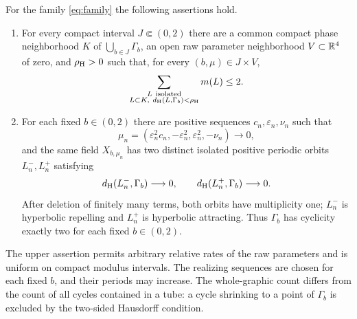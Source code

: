 \begin{samepage}
\begin{theorem}\label{thm:main}
For the family \eqref{eq:family} the following assertions hold.
\begin{enumerate}
\item For every compact interval $J\Subset(0,2)$ there are a common
compact phase neighborhood $K$ of $\bigcup_{b\in J}\Gamma_b$, an open
raw parameter neighborhood $V\subset\mathbb R^4$ of zero, and
$\rho_{\rm H}>0$ such that, for every $(b,\mu)\in J\times V$,
\begin{equation}\label{eq:upper-total}
 \sum_{\substack{L\ {\rm isolated}\\L\subset K,\
                         d_{\rm H}(L,\Gamma_b)<\rho_{\rm H}}}m(L)\le2 .
\end{equation}
\item For each fixed $b\in(0,2)$ there are positive sequences
$c_n,\varepsilon_n,\nu_n$ such that
\begin{equation}\label{eq:realizing-parameters}
 \mu_n=(\varepsilon_n^2c_n,-\varepsilon_n^2,
                          \varepsilon_n^2,-\nu_n)\longrightarrow0,
\end{equation}
and the same field $X_{b,\mu_n}$ has two distinct isolated positive
periodic orbits $L_n^-,L_n^+$ satisfying
\begin{equation}\label{eq:two-whole-limits}
 d_{\rm H}(L_n^-,\Gamma_b)\longrightarrow0,\qquad
 d_{\rm H}(L_n^+,\Gamma_b)\longrightarrow0.
\end{equation}
After deletion of finitely many terms, both orbits have multiplicity one;
$L_n^-$ is hyperbolic repelling and $L_n^+$ is hyperbolic attracting.
Thus $\Gamma_b$ has cyclicity exactly two for each fixed $b\in(0,2)$.
\end{enumerate}
\end{theorem}
\end{samepage}

The upper assertion permits arbitrary relative rates of the raw
parameters and is uniform on compact modulus intervals. The realizing
sequences are chosen for each fixed $b$, and their periods may increase.
The whole-graphic count differs from the count of all cycles contained
in a tube: a cycle shrinking to a point of $\Gamma_b$ is excluded by the
two-sided Hausdorff condition.



